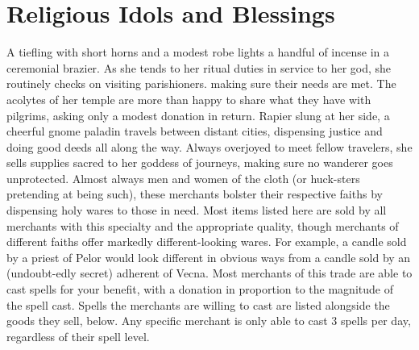 \documentclass[10pt,a4paper,twoside,twocolumn,openany,nodeprecatedcode,bg=print]{dndbook}
\begin{document}
\section{Religious Idols and Blessings}
A tiefling with short horns and a modest robe lights a handful of incense in a ceremonial brazier. As she tends to her ritual duties in service to her god, she routinely checks on visiting parishioners. making sure their needs are met. The acolytes of her temple are more than happy to share what they have with pilgrims, asking only a modest donation in return.
Rapier slung at her side, a cheerful gnome paladin travels between distant cities, dispensing justice and doing good deeds all along the way. Always overjoyed to meet fellow travelers, she sells supplies sacred to her goddess of journeys, making sure no wanderer goes unprotected.
Almost always men and women of the cloth (or huck-sters pretending at being such), these merchants bolster their respective faiths by dispensing holy wares to those in need. Most items listed here are sold by all merchants with this specialty and the appropriate quality, though merchants of different faiths offer markedly different-looking wares. For example, a candle sold by a priest of Pelor would look different in obvious ways from a candle sold by an (undoubt-edly secret) adherent of Vecna.
Most merchants of this trade are able to cast spells for your benefit, with a donation in proportion to the magnitude of the spell cast. Spells the merchants are willing to cast are listed alongside the goods they sell, below. Any specific merchant is only able to cast 3 spells per day, regardless of their spell level.
\end{document}
